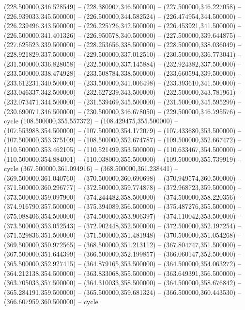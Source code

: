    (228.500000,346.528549) -- (228.380907,346.500000) -- (227.500000,346.227058) -- (226.939033,345.500000) -- (226.500000,344.582524) -- (226.474954,344.500000) -- (226.239496,343.500000) -- (226.225726,342.500000) -- (226.453921,341.500000) -- (226.500000,341.401326) -- (226.950578,340.500000) -- (227.500000,339.644875) -- (227.625523,339.500000) -- (228.253656,338.500000) -- (228.500000,338.036049) -- (228.921829,337.500000) -- (229.500000,337.012510) -- (230.500000,336.773041) -- (231.500000,336.828058) -- (232.500000,337.145884) -- (232.924382,337.500000) -- (233.500000,338.474928) -- (233.508784,338.500000) -- (233.660594,339.500000) -- (233.612231,340.500000) -- (233.500000,341.006498) -- (233.393610,341.500000) -- (233.046337,342.500000) -- (232.627239,343.500000) -- (232.500000,343.781961) -- (232.073471,344.500000) -- (231.539469,345.500000) -- (231.500000,345.595299) -- (230.690071,346.500000) -- (230.500000,346.678050) -- (229.500000,346.795576) -- cycle
   (108.500000,355.557372) -- (108.429475,355.500000) -- (107.553988,354.500000) -- (107.500000,354.172079) -- (107.433680,353.500000) -- (107.500000,353.375109) -- (108.500000,352.674787) -- (109.500000,352.667472) -- (110.500000,353.462105) -- (110.521499,353.500000) -- (110.633467,354.500000) -- (110.500000,354.884001) -- (110.038000,355.500000) -- (109.500000,355.739919) -- cycle
   (367.500000,361.094916) -- (368.500000,361.238441) -- (369.500000,361.040760) -- (370.500000,360.690698) -- (370.949574,360.500000) -- (371.500000,360.296777) -- (372.500000,359.774878) -- (372.968723,359.500000) -- (373.500000,359.097900) -- (374.244482,358.500000) -- (374.500000,358.220356) -- (374.916790,357.500000) -- (375.394089,356.500000) -- (375.487276,355.500000) -- (375.088406,354.500000) -- (374.500000,353.906397) -- (374.110042,353.500000) -- (373.500000,353.052543) -- (372.902448,352.500000) -- (372.500000,352.197254) -- (371.529836,351.500000) -- (371.500000,351.481948) -- (370.500000,351.054268) -- (369.500000,350.972565) -- (368.500000,351.213112) -- (367.804747,351.500000) -- (367.500000,351.644399) -- (366.500000,352.199857) -- (366.060147,352.500000) -- (365.500000,352.927415) -- (364.879165,353.500000) -- (364.500000,354.063272) -- (364.212138,354.500000) -- (363.833068,355.500000) -- (363.649391,356.500000) -- (363.705033,357.500000) -- (364.310033,358.500000) -- (364.500000,358.676842) -- (365.284191,359.500000) -- (365.500000,359.681324) -- (366.500000,360.443530) -- (366.607959,360.500000) -- cycle

